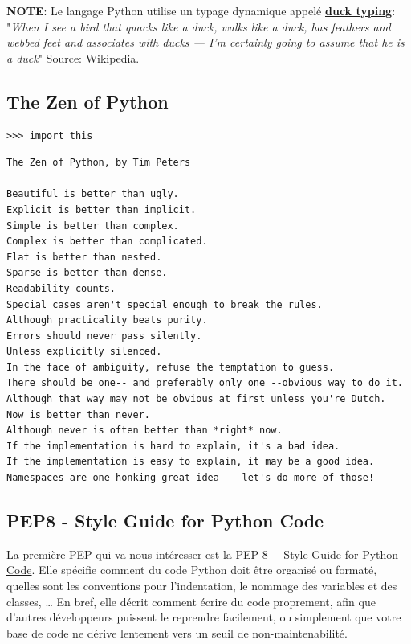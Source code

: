 \documentclass[11pt]{amsbook}
\newcommand{\admonition}[2]{\textbf{#1}: {#2}}
\begin{document}
\admonition{NOTE}{Le langage Python utilise un typage dynamique appelé \href{https://fr.wikipedia.org/wiki/Duck_typing}{\textbf{duck typing}}: "\emph{When I see a bird that quacks like a duck, walks like a duck, has feathers and webbed feet and associates with ducks — I’m certainly going to assume that he is a duck}"
Source: \href{http://en.wikipedia.org/wiki/Duck_test}{Wikipedia}.}
\hypertarget{x-the-zen-of-python}{\subsection{The Zen of Python}}
\begin{verbatim}
>>> import this
\end{verbatim}

\begin{verbatim}
The Zen of Python, by Tim Peters

Beautiful is better than ugly.
Explicit is better than implicit.
Simple is better than complex.
Complex is better than complicated.
Flat is better than nested.
Sparse is better than dense.
Readability counts.
Special cases aren't special enough to break the rules.
Although practicality beats purity.
Errors should never pass silently.
Unless explicitly silenced.
In the face of ambiguity, refuse the temptation to guess.
There should be one-- and preferably only one --obvious way to do it.
Although that way may not be obvious at first unless you're Dutch.
Now is better than never.
Although never is often better than *right* now.
If the implementation is hard to explain, it's a bad idea.
If the implementation is easy to explain, it may be a good idea.
Namespaces are one honking great idea -- let's do more of those!
\end{verbatim}

\hypertarget{x-pep8---style-guide-for-python-code}{\subsection{PEP8 - Style Guide for Python Code}}
La première PEP qui va nous intéresser est la \href{https://www.python.org/dev/peps/pep-0008/}{PEP 8 — Style Guide for Python Code}. Elle spécifie comment du code Python doit être organisé ou formaté, quelles sont les conventions pour l’indentation, le nommage des variables et des classes, …​
En bref, elle décrit comment écrire du code proprement, afin que d’autres développeurs puissent le reprendre facilement, ou simplement que votre base de code ne dérive lentement vers un seuil de non-maintenabilité.
\end{document}
